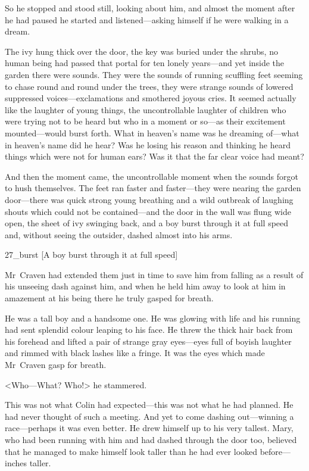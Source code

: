 So he stopped and stood still, looking about him, and almost the moment after he had paused he started and listened—asking himself if he were walking in a dream.

The ivy hung thick over the door, the key was buried under the shrubs, no human being had passed that portal for ten lonely years—and yet inside the garden there were sounds. They were the sounds of running scuffling feet seeming to chase round and round under the trees, they were strange sounds of lowered suppressed voices—exclamations and smothered joyous cries. It seemed actually like the laughter of young things, the uncontrollable laughter of children who were trying not to be heard but who in a moment or so—as their excitement mounted—would burst forth. What in heaven's name was he dreaming of—what in heaven's name did he hear? Was he losing his reason and thinking he heard things which were not for human ears? Was it that the far clear voice had meant?

And then the moment came, the uncontrollable moment when the sounds forgot to hush themselves. The feet ran faster and faster—they were nearing the garden door—there was quick strong young breathing and a wild outbreak of laughing shouts which could not be contained—and the door in the wall was flung wide open, the sheet of ivy swinging back, and a boy burst through it at full speed and, without seeing the outsider, dashed almost into his arms.

\begin{colorbigpic}
	[\basicscale]
	{27_burst}
	[A boy burst through it at full speed]
\end{colorbigpic}

Mr~Craven had extended them just in time to save him from falling as a result of his unseeing dash against him, and when he held him away to look at him in amazement at his being there he truly gasped for breath.

He was a tall boy and a handsome one. He was glowing with life and his running had sent splendid colour leaping to his face. He threw the thick hair back from his forehead and lifted a pair of strange gray eyes—eyes full of boyish laughter and rimmed with black lashes like a fringe. It was the eyes which made Mr~Craven gasp for breath.

<Who—What? Who!> he stammered.

This was not what Colin had expected—this was not what he had planned. He had never thought of such a meeting. And yet to come dashing out—winning a race—perhaps it was even better. He drew himself up to his very tallest. Mary, who had been running with him and had dashed through the door too, believed that he managed to make himself look taller than he had ever looked before—inches taller.


